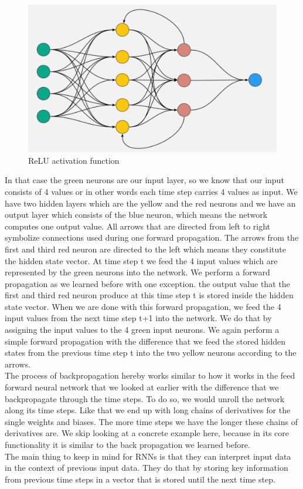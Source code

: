 \documentclass[a4paper,12pt]{report}
\begin{document}
	\begin{figure}[htbp]
  \centering
  \includegraphics[width=\textwidth]{images/RNN.png}
  \caption{ReLU activation function}
  \label{fig:fullwidth}
\end{figure}
	
	
	In that case the green neurons are our input layer, so we know that our input consists of 4 values or in other words each time step carries 4 values as input. We have two hidden layers which are the yellow and the red neurons and we have an output layer which consists of the blue neuron, which means the network computes one output value. All arrows that are directed from left to right symbolize connections used during one forward propagation. The arrows from the first and third red neuron are directed to the left which means they constitute the hidden state vector. At time step t we feed the 4 input values which are represented by the green neurons into the network. We perform a forward propagation as we learned before with one exception. the output value that the first and third red neuron produce at this time step t is stored inside the hidden state vector. When we are done with this forward propagation, we feed the 4 input values from the next time step t+1 into the network. We do that by assigning the input values to the 4 green input neurons. We again perform a simple forward propagation with the difference that we feed the stored hidden states from the previous time step t into the two yellow neurons according to the arrows.\\
	The process of backpropagation hereby works similar to how it works in the feed forward neural network that we looked at earlier with the difference that we backpropagate through the time steps. To do so, we would unroll the network along its time steps. Like that we end up with long chains of derivatives for the single weights and biases. The more time steps we have the longer these chains of derivatives are. We skip looking at a concrete example here, because in its core functionality it is similar to the back propagation we learned before. \\
	The main thing to keep in mind for RNNs is that they can interpret input data in the context of previous input data. They do that by storing key information from previous time steps in a vector that is stored until the next time step.
	
\end{document}
